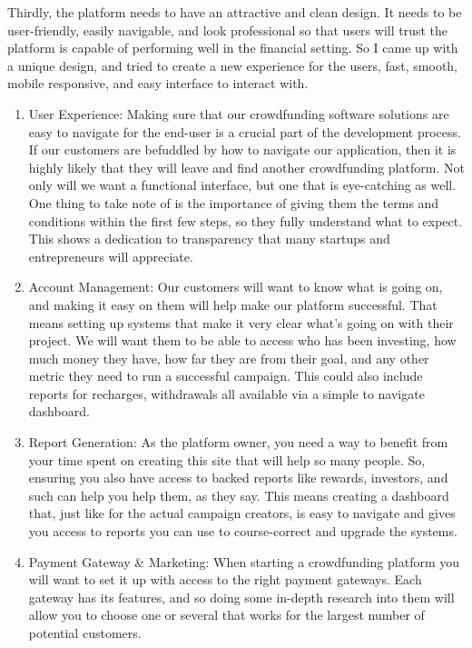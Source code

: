 Thirdly, the platform needs to have an attractive and clean design. It needs to be user-friendly, easily navigable, and look professional so that users will trust the platform is capable of performing
well in the financial setting. So I came up with a unique design, and tried to create a new experience for the users, fast,
smooth, mobile responsive, and easy interface to interact with.
\begin{enumerate}
      \item
            User Experience:
            Making sure that our crowdfunding software solutions are easy to navigate for the end-user is a crucial part of the development process. If our customers are befuddled by how to navigate our application, then it is highly likely that they will leave and find another crowdfunding platform. Not only will we want a functional interface, but one that is eye-catching as well.
            One thing to take note of is the importance of giving them the terms and conditions within the first few steps, so they fully understand what to expect. This shows a dedication to transparency that many startups and entrepreneurs will appreciate.

      \item
            Account Management:
            Our customers will want to know what is going on, and making it easy on them will help make our platform successful. That means setting up systems that make it very clear what’s going on with their project. We will want them to be able to access who has been investing, how much money they have, how far they are from their goal, and any other metric they need to run a successful campaign. This could also include reports for recharges, withdrawals all available via a simple to navigate dashboard.
      \item
            Report Generation:
            As the platform owner, you need a way to benefit from your time spent on creating this site that will help so many people. So, ensuring you also have access to backed reports like rewards, investors, and such can help you help them, as they say. This means creating a dashboard that, just like for the actual campaign creators, is easy to navigate and gives you access to reports you can use to course-correct and upgrade the systems.
      \item
            Payment Gateway \& Marketing:
            When starting a crowdfunding platform you will want to set it up with access to the right payment gateways. Each gateway has its features, and so doing some in-depth research into them will allow you to choose one or several that works for the largest number of potential customers.
\end{enumerate}



